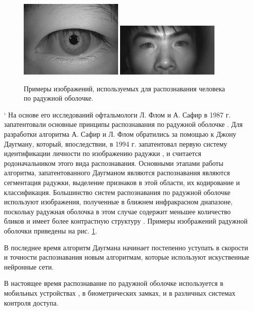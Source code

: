 \documentclass[14pt, a4paper]{extarticle}
\begin{document}
\begin{center}
\begin{figure}[h!]
	\centering
	\includegraphics[width=0.45\textwidth]{iris_sample_1.png}
	\hspace{0.05\textwidth}
	\includegraphics[width=0.45\textwidth]{iris_sample_2.png}
	\caption{Примеры изображений, используемых для распознавания человека по радужной оболочке.}
	\label{img:iris_samples}
\end{figure}
\end{center}
\vspace{-1cm}`
На основе его исследований офтальмологи Л. Флом и А. Сафир в 1987 г. запатентовали основные принципы распознавания по радужной оболочке \cite{flom1987iris}. Для разработки алгоритма А. Сафир и Л. Флом обратились за помощью к Джону Даугману, который, впоследствии, в 1994 г. запатентовал первую систему идентификации личности по изображению радужки \cite{daugman1994biometric}, и считается родоначальником этого вида распознавания. Основными этапами работы алгоритма, запатентованного Даугманом являются распознавания являются сегментация радужки, выделение признаков в этой области, их кодирование и классификация.
Большинство систем распознавания по радужной оболочке используют изображения, полученные в ближнем инфракрасном диапазоне, поскольку радужная оболочка в этом случае содержит меньшее количество бликов и имеет более контрастную структуру \cite{Daugman02}. Примеры изображений радужной оболочки приведены на рис. \ref{img:iris_samples}.

В последнее время алгоритм Даугмана начинает постепенно уступать в скорости и точности распознавания новым алгоритмам, которые используют искуственные нейронные сети.

В настоящее время распознавание по радужной оболочке используется в мобильных устройствах \cite{odinokikh2018high}, в биометрических замках, и в различных системах контроля доступа.
\end{document}
